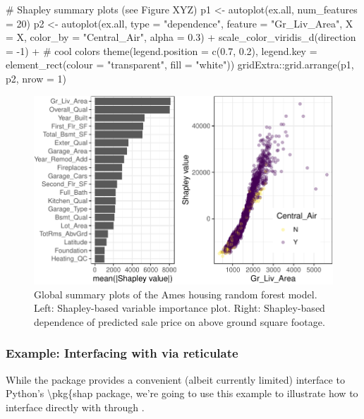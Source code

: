 \begin{Schunk}
\begin{Sinput}
# Shapley summary plots (see Figure XYZ)
p1 <- autoplot(ex.all, num_features = 20)
p2 <- autoplot(ex.all, type = "dependence", feature = "Gr_Liv_Area", X = X,
               color_by = "Central_Air", alpha = 0.3) +
  scale_color_viridis_d(direction = -1) +  # cool colors
  theme(legend.position = c(0.7, 0.2), 
        legend.key = element_rect(colour = "transparent", fill = "white"))
gridExtra::grid.arrange(p1, p2, nrow = 1)
\end{Sinput}
\begin{figure}[!htb]

{\centering \includegraphics[width=1\linewidth]{greenwell_files/figure-latex/ex-ames-fastshap-autoplot-1} 

}

\caption[Global summary plots of the Ames housing random forest model]{Global summary plots of the Ames housing random forest model. Left: Shapley-based variable importance plot. Right: Shapley-based dependence of predicted sale price on above ground square footage.}\label{fig:ex-ames-fastshap-autoplot}
\end{figure}
\end{Schunk}

\subsubsection{Example: Interfacing with  via reticulate}

While the  package provides a convenient (albeit currently
limited) interface to Python's \textbackslash pkg\{shap package, we're
going to use this example to illustrate how to interface directly with
 through .


